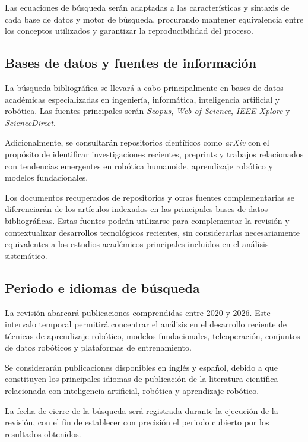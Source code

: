 \documentclass[stu,12pt,floatsintext]{apa7}
\begin{document}
Las ecuaciones de búsqueda serán adaptadas a las características y sintaxis de cada base de datos y motor de búsqueda, procurando mantener equivalencia entre los conceptos utilizados y garantizar la reproducibilidad del proceso.

\subsection{Bases de datos y fuentes de información}

La búsqueda bibliográfica se llevará a cabo principalmente en bases de datos académicas especializadas en ingeniería, informática, inteligencia artificial y robótica. Las fuentes principales serán \textit{Scopus}, \textit{Web of Science}, \textit{IEEE Xplore} y \textit{ScienceDirect}.

Adicionalmente, se consultarán repositorios científicos como \textit{arXiv} con el propósito de identificar investigaciones recientes, preprints y trabajos relacionados con tendencias emergentes en robótica humanoide, aprendizaje robótico y modelos fundacionales.

Los documentos recuperados de repositorios y otras fuentes complementarias se diferenciarán de los artículos indexados en las principales bases de datos bibliográficas. Estas fuentes podrán utilizarse para complementar la revisión y contextualizar desarrollos tecnológicos recientes, sin considerarlas necesariamente equivalentes a los estudios académicos principales incluidos en el análisis sistemático.

\subsection{Periodo e idiomas de búsqueda}

La revisión abarcará publicaciones comprendidas entre 2020 y 2026. Este intervalo temporal permitirá concentrar el análisis en el desarrollo reciente de técnicas de aprendizaje robótico, modelos fundacionales, teleoperación, conjuntos de datos robóticos y plataformas de entrenamiento.

Se considerarán publicaciones disponibles en inglés y español, debido a que constituyen los principales idiomas de publicación de la literatura científica relacionada con inteligencia artificial, robótica y aprendizaje robótico.

La fecha de cierre de la búsqueda será registrada durante la ejecución de la revisión, con el fin de establecer con precisión el periodo cubierto por los resultados obtenidos.
\end{document}
